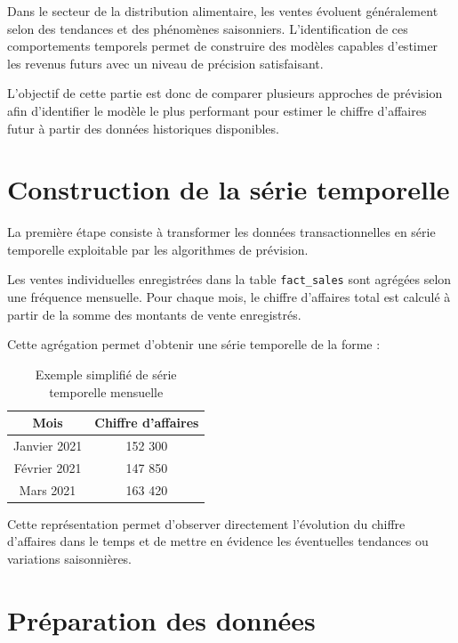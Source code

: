 \documentclass[12pt,a4paper,twoside]{report}
\begin{document}
Dans le secteur de la distribution alimentaire, les ventes évoluent généralement selon des tendances et des phénomènes saisonniers. L'identification de ces comportements temporels permet de construire des modèles capables d'estimer les revenus futurs avec un niveau de précision satisfaisant.

L'objectif de cette partie est donc de comparer plusieurs approches de prévision afin d'identifier le modèle le plus performant pour estimer le chiffre d'affaires futur à partir des données historiques disponibles.

\section{Construction de la série temporelle}

La première étape consiste à transformer les données transactionnelles en série temporelle exploitable par les algorithmes de prévision.

Les ventes individuelles enregistrées dans la table \texttt{fact\_sales} sont agrégées selon une fréquence mensuelle. Pour chaque mois, le chiffre d'affaires total est calculé à partir de la somme des montants de vente enregistrés.

Cette agrégation permet d'obtenir une série temporelle de la forme :

\begin{table}[H]
\centering
{}
\begin{tabular}{cc}
\toprule
\rowcolor{TableHeader}
\color{white}Mois & \color{white}Chiffre d'affaires \\
\midrule
Janvier 2021 & 152 300 \\
Février 2021 & 147 850 \\
Mars 2021 & 163 420 \\

\bottomrule
\end{tabular}
\caption{Exemple simplifié de série temporelle mensuelle}
\end{table}

Cette représentation permet d'observer directement l'évolution du chiffre d'affaires dans le temps et de mettre en évidence les éventuelles tendances ou variations saisonnières.

\section{Préparation des données}
\end{document}

